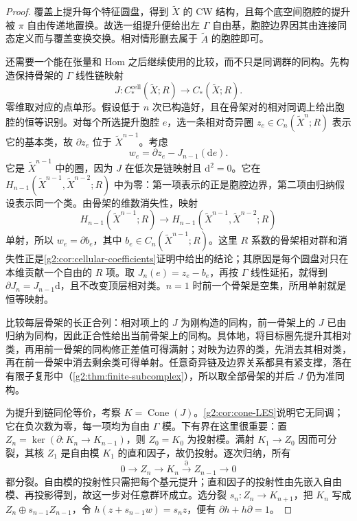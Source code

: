 \begin{proof}
	覆盖上提升每个特征圆盘，得到 \(\widetilde X\) 的 CW 结构，且每个底空间胞腔的提升被 \(\pi\) 自由传递地置换。故选一组提升便给出左 \(\Gamma\) 自由基，胞腔边界因其由连接同态定义而与覆盖变换交换。相对情形删去属于 \(\widetilde A\) 的胞腔即可。

	还需要一个能在张量和 Hom 之后继续使用的比较，而不只是同调群的同构。先构造保持骨架的 \(\Gamma\) 线性链映射
	\[
		J:C_*^{\mathrm{cell}}(\widetilde X;R)\longrightarrow C_*(\widetilde X;R).
	\]
	零维取对应的点单形。假设低于 \(n\) 次已构造好，且在骨架对的相对同调上给出胞腔的恒等识别。对每个所选提升胞腔 \(e\)，选一条相对奇异圈 \(z_e\in C_n(\widetilde X^n;R)\) 表示它的基本类，故 \(\partial z_e\) 位于 \(\widetilde X^{n-1}\)。考虑
	\[
		w_e=\partial z_e-J_{n-1}(\mathrm d e).
	\]
	它是 \(\widetilde X^{n-1}\) 中的圈，因为 \(J\) 在低次是链映射且 \(\mathrm d^2=0\)。它在 \(H_{n-1}(\widetilde X^{n-1},\widetilde X^{n-2};R)\) 中为零：第一项表示的正是胞腔边界，第二项由归纳假设表示同一个类。由骨架的维数消失性，映射
	\[
		H_{n-1}(\widetilde X^{n-1};R)\longrightarrow
		H_{n-1}(\widetilde X^{n-1},\widetilde X^{n-2};R)
	\]
	单射，所以 \(w_e=\partial b_e\)，其中 \(b_e\in C_n(\widetilde X^{n-1};R)\)。这里 \(R\) 系数的骨架相对群和消失性正是\cref{g2:cor:cellular-coefficients}证明中给出的结论；其原因是每个圆盘对只在本维贡献一个自由的 \(R\) 项。取 \(J_n(e)=z_e-b_e\)，再按 \(\Gamma\) 线性延拓，就得到 \(\partial J_n=J_{n-1}\mathrm d\)，且不改变顶层相对类。\(n=1\) 时前一个骨架是空集，所用单射就是恒等映射。

	比较每层骨架的长正合列：相对项上的 \(J\) 为刚构造的同构，前一骨架上的 \(J\) 已由归纳为同构，因此正合性给出当前骨架上的同构。具体地，将目标圈先提升其相对类，再用前一骨架的同构修正差值可得满射；对映为边界的类，先消去其相对类，再在前一骨架中消去剩余类可得单射。任意奇异链及边界关系都具有紧支撑，落在有限子复形中（\cref{g2:thm:finite-subcomplex}），所以取全部骨架的并后 \(J\) 仍为准同构。

	为提升到链同伦等价，考察 \(K=\operatorname{Cone}(J)\)。\cref{g2:cor:cone-LES}说明它无同调；它在负次数为零，每一项均为自由 \(\Gamma\) 模。下有界在这里很重要：置 \(Z_n=\ker(\partial:K_n\to K_{n-1})\)，则 \(Z_0=K_0\) 为投射模。满射 \(K_1\to Z_0\) 因而可分裂，其核 \(Z_1\) 是自由模 \(K_1\) 的直和因子，故仍投射。逐次归纳，所有
	\[
		0\longrightarrow Z_n\longrightarrow K_n\xrightarrow{\partial}Z_{n-1}\longrightarrow0
	\]
	都分裂。自由模的投射性只需把每个基元提升；直和因子的投射性由先嵌入自由模、再投影得到，故这一步对任意群环成立。选分裂 \(s_n:Z_n\to K_{n+1}\)，把 \(K_n\) 写成 \(Z_n\oplus s_{n-1}Z_{n-1}\)，令 \(h(z+s_{n-1}w)=s_nz\)，便有 \(\partial h+h\partial=1\)。


\end{proof}
